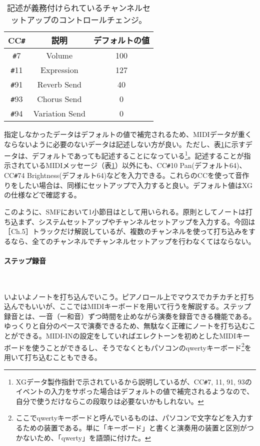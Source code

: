 \documentclass[uplatex, 10pt, dvipdfmx]{jsarticle}
\numberwithin{equation}{section}
\newcommand{\emphj}[1]{\textbf{\textrm{\textgt{{#1}}}}}
\begin{document}
\begin{table}[htbp]
  \caption{記述が義務付けられているチャンネルセットアップのコントロールチェンジ\cite{XG指針}。}
  \label{tabXGchannelsetup}
  \centering
  \begin{tabular}{ccc}
  CC\texttt{\#} & 説明 & デフォルトの値\cite{XG仕様}\\
  \hline
  \texttt{\#}7 & Volume & 100 \\
  \texttt{\#}11 & Expression & 127 \\
  \texttt{\#}91 & Reverb Send & 40 \\
  \texttt{\#}93 & Chorus Send & 0\\
  \texttt{\#}94 & Variation Send\footnotemark & 0\\
  \hline
  \end{tabular}
\end{table}

指定しなかったデータはデフォルトの値で補完されるため、MIDIデータが重くならないように必要のないデータは記述しない方が良い。ただし、表\ref{tabXGchannelsetup}に示すデータは、デフォルトであっても記述することになっている\footnote{XGデータ製作指針\cite{XG指針}で示されているから説明しているが、CC\texttt{\#}7, 11, 91, 93のイベントの入力をサボった場合はデフォルトの値で補完されるようなので、自分で使うだけならこの段取りは必要ないかもしれない。}。記述することが指示されているMIDIメッセージ（表\ref{tabXGchannelsetup}）以外にも、CC\texttt{\#}10 Pan(デフォルト64)、CC\texttt{\#}74 Brightness(デフォルト64)などを入力できる。これらのCCを使って音作りをしたい場合は、同様にセットアップで入力すると良い。デフォルト値はXGの仕様\cite{XG仕様}などで確認する。

このように、SMFにおいて1小節目は\emphj{セットアップ小節}として用いられる。原則としてノートは打ち込まず、システムセットアップやチャンネルセットアップを入力する。今回は［Ch.5］トラックだけ解説しているが、複数のチャンネルを使って打ち込みをするなら、全てのチャンネルでチャンネルセットアップを行わなくてはならない。

\paragraph{ステップ録音} \ 

いよいよノートを打ち込んでいこう。ピアノロール上でマウスでカチカチと打ち込んでもいいが、ここではMIDIキーボードを用いて行う\emphj{ステップ録音}を解説する。ステップ録音とは、一音（一和音）ずつ時間を止めながら演奏を録音できる機能である。ゆっくりと自分のペースで演奏できるため、無駄なく正確にノートを打ち込むことができる。MIDI-INの設定をしていればエレクトーンを初めとしたMIDIキーボードを使うことができるし、そうでなくともパソコンのqwertyキーボード\footnote{ここでqwertyキーボードと呼んでいるものは、パソコンで文字などを入力するための装置である。単に「キーボード」と書くと演奏用の装置と区別がつかないため、「qwerty」を語頭に付けた。}を用いて打ち込むこともできる。
\end{document}
